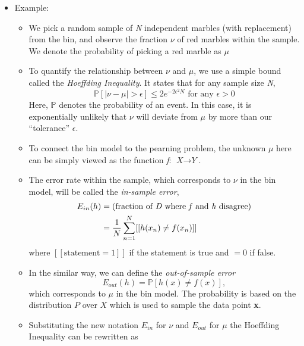 \begin{itemize}[noitemsep, topsep=0pt]
    \item Example:
    \begin{itemize}[noitemsep, topsep=0pt]
        \item We pick a random sample of \textit{N} independent marbles (with replacement) from the bin, and observe the fraction $\nu$ of red marbles within the sample. We denote the probability of picking a red marble as $\mu$
        \item To quantify the relationship between $\nu$ and $\mu$, we use a simple bound called the \textit{Hoeffding Inequality}. It states that for any sample size \textit{N},
            \begin{equation} \label{eqn:Hoeffding Inequality}
            \mathbb{P}[|\nu - \mu| > \epsilon] \leq 2e^{-2\epsilon^2N}  \text{ for any $\epsilon > 0$}
        \end{equation}
        Here, $\mathbb{P}$ denotes the probability of an event. In this case, it is exponentially unlikely that $\nu$ will deviate from $\mu$ by more than our ``tolerance'' $\epsilon$.
        \item To connect the bin model to the pearning problem, the unknown $\mu$ here can be simply viewed as the function \textit{f}: $\textit{X} \rightarrow \textit{Y}$.
        \item The error rate within the sample, which corresponds to $\nu$ in the bin model, will be called the \textit{in-sample error},
        \begin{equation}
        \begin{aligned}
            E_{in}(h) &= \text{(fraction of \textit{D} where \textit{f} and \textit{h} disagree)}\\
                      &= \frac{1}{N} \sum_{n=1}^{N} [[h(x_n) \neq f(x_n)]]
        \end{aligned}
        \end{equation}
        where $[[\text{statement} = 1]]$ if the statement is true and $= 0$ if false.
        \item In the similar way, we can define the \textit{out-of-sample error}
        \begin{equation}
            E_{out}(h) = \mathbb{P}[h(x) \neq f(x)],
        \end{equation}
            which corresponds to $\mu$ in the bin model. The probability is based on the distribution $P$ over $X$ which is used to sample the data point \textbf{x}.
        \item Substituting the new notation $E_{in}$ for $\nu$ and $E_{out}$ for $\mu$ the Hoeffding Inequality can be rewritten as

\end{itemize}
\end{itemize}
